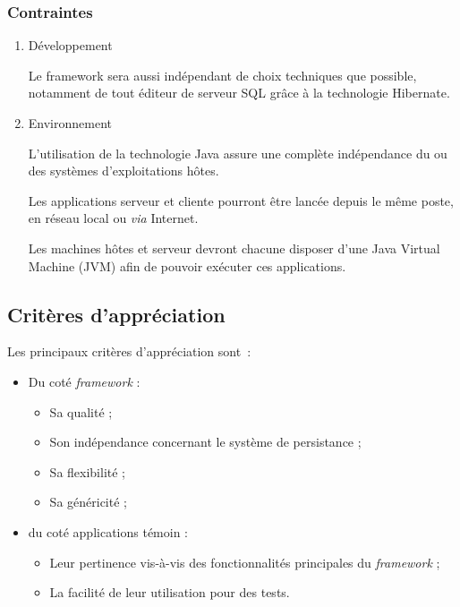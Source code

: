\subsubsection{Contraintes}
\begin{enumerate}

	\item Développement

Le framework sera aussi indépendant de choix techniques que possible, notamment de tout éditeur de serveur SQL grâce à la technologie Hibernate.

	\item Environnement

L'utilisation de la technologie Java assure une complète indépendance du ou des systèmes d'exploitations hôtes.

Les applications serveur et cliente pourront être lancée depuis le même poste, en réseau local ou \emph{via} Internet.

Les machines hôtes et serveur devront chacune disposer d'une Java Virtual Machine (JVM) afin de pouvoir exécuter ces applications.

\end{enumerate}

\subsection{Critères d’appréciation}

Les principaux critères d'appréciation sont~:

\begin{itemize}
	\item Du coté \emph{framework} :
	\begin{itemize} 
		\item Sa qualité ;
		\item Son indépendance concernant le système de persistance ;
		\item Sa flexibilité ;
		\item Sa généricité ;
	\end{itemize} 
	\item du coté applications témoin :
	\begin{itemize}
		\item Leur pertinence vis-à-vis des fonctionnalités principales du \emph{framework} ;
		\item La facilité de leur utilisation pour des tests.
	\end{itemize}
\end{itemize}


